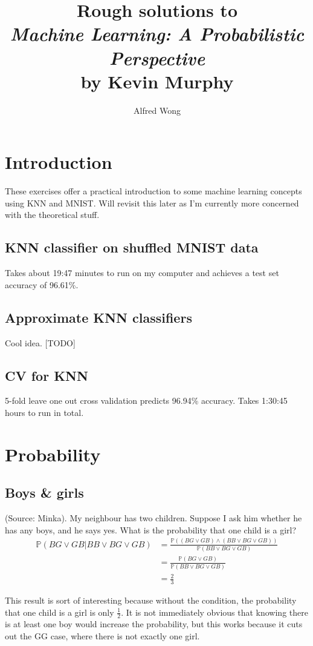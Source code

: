 \documentclass{article}
\title{Rough solutions to\\\textit{Machine Learning: A Probabilistic Perspective}\\by Kevin Murphy}
\author{Alfred Wong}
\date{\vspace{-\baselineskip}}
\begin{document}
\maketitle
\pagebreak
\tableofcontents
\pagebreak

\section{Introduction}
These exercises offer a practical introduction to some machine learning concepts using KNN and MNIST. Will revisit this later as I'm currently more concerned with the theoretical stuff.
\subsection{KNN classifier on shuffled MNIST data}
Takes about 19:47 minutes to run on my computer and achieves a test set accuracy of 96.61\%.
\subsection{Approximate KNN classifiers}
Cool idea. [TODO]
\subsection{CV for KNN}
5-fold leave one out cross validation predicts 96.94\% accuracy. Takes 1:30:45 hours to run in total.
\pagebreak

\section{Probability}
\subsection{Boys \& girls}
(Source: Minka). My neighbour has two children. Suppose I ask him whether he has any boys, and he says yes. What is the probability that one child is a girl?
\begin{align*}
\mathbb{P}(BG \lor GB | BB \lor BG \lor GB) &= \frac{\mathbb{P}((BG \lor GB) \land (BB \lor BG \lor GB))}{\mathbb{P}(BB \lor BG \lor GB)}\\
&= \frac{\mathbb{P}(BG \lor GB)}{\mathbb{P}(BB \lor BG \lor GB)}\\
&= \frac{2}{3}
\end{align*}

This result is sort of interesting because without the condition, the probability that one child is a girl is only $\frac{1}{2}$. It is not immediately obvious that knowing there is at least one boy would increase the probability, but this works because it cuts out the GG case, where there is not exactly one girl.
\end{document}
